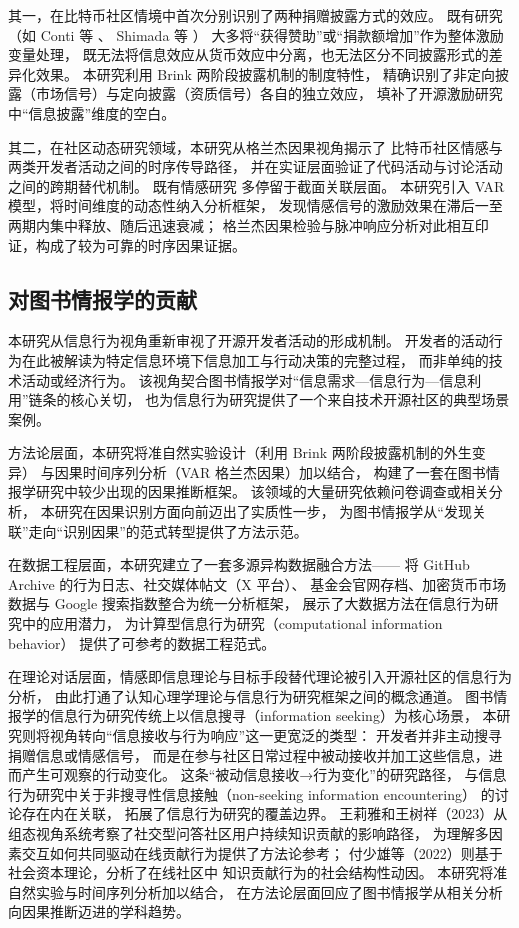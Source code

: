 \documentclass[
    type = master, %
    degree = professional,        %
    decl-page,  %
    twoside,                %
    fontset = fandol %
  ]{njuthesis}
\begin{document}
其一，在比特币社区情境中首次分别识别了两种捐赠披露方式的效应。
既有研究（如 Conti 等 \citeyear{conti2023incentivizing}、
Shimada 等 \citeyear{shimada2022github}）
大多将“获得赞助”或“捐款额增加”作为整体激励变量处理，
既无法将信息效应从货币效应中分离，也无法区分不同披露形式的差异化效果。
本研究利用 Brink 两阶段披露机制的制度特性，
精确识别了非定向披露（市场信号）与定向披露（资质信号）各自的独立效应，
填补了开源激励研究中“信息披露”维度的空白。

其二，在社区动态研究领域，本研究从格兰杰因果视角揭示了
比特币社区情感与两类开发者活动之间的时序传导路径，
并在实证层面验证了代码活动与讨论活动之间的跨期替代机制。
既有情感研究\cite{guzzi2013,yang2021differential,zhang2024ugc}
多停留于截面关联层面。
本研究引入 VAR 模型，将时间维度的动态性纳入分析框架，
发现情感信号的激励效果在滞后一至两期内集中释放、随后迅速衰减；
格兰杰因果检验与脉冲响应分析对此相互印证，构成了较为可靠的时序因果证据。

\subsection{对图书情报学的贡献}

本研究从信息行为视角重新审视了开源开发者活动的形成机制。
开发者的活动行为在此被解读为特定信息环境下信息加工与行动决策的完整过程，
而非单纯的技术活动或经济行为。
该视角契合图书情报学对“信息需求—信息行为—信息利用”链条的核心关切，
也为信息行为研究提供了一个来自技术开源社区的典型场景案例。

方法论层面，本研究将准自然实验设计（利用 Brink 两阶段披露机制的外生变异）
与因果时间序列分析（VAR 格兰杰因果）加以结合，
构建了一套在图书情报学研究中较少出现的因果推断框架。
该领域的大量研究依赖问卷调查或相关分析，
本研究在因果识别方面向前迈出了实质性一步，
为图书情报学从“发现关联”走向“识别因果”的范式转型提供了方法示范。

在数据工程层面，本研究建立了一套多源异构数据融合方法——
将 GitHub Archive 的行为日志、社交媒体帖文（X 平台）、
基金会官网存档、加密货币市场数据与 Google 搜索指数整合为统一分析框架，
展示了大数据方法在信息行为研究中的应用潜力，
为计算型信息行为研究（computational information behavior）
提供了可参考的数据工程范式。

在理论对话层面，情感即信息理论与目标手段替代理论被引入开源社区的信息行为分析，
由此打通了认知心理学理论与信息行为研究框架之间的概念通道。
图书情报学的信息行为研究传统上以信息搜寻（information seeking）为核心场景，
本研究则将视角转向“信息接收与行为响应”这一更宽泛的类型：
开发者并非主动搜寻捐赠信息或情感信号，
而是在参与社区日常过程中被动接收并加工这些信息，进而产生可观察的行动变化。
这条“被动信息接收→行为变化”的研究路径，
与信息行为研究中关于非搜寻性信息接触（non-seeking information encountering）
的讨论存在内在关联\cite{sun2017motivation}，
拓展了信息行为研究的覆盖边界。
王莉雅和王树祥（2023）从组态视角系统考察了社交型问答社区用户持续知识贡献的影响路径，
为理解多因素交互如何共同驱动在线贡献行为提供了方法论参考\cite{wang2023config}；
付少雄等（2022）则基于社会资本理论，分析了在线社区中
知识贡献行为的社会结构性动因\cite{fu2022social}。
本研究将准自然实验与时间序列分析加以结合，
在方法论层面回应了图书情报学从相关分析向因果推断迈进的学科趋势。
\end{document}
